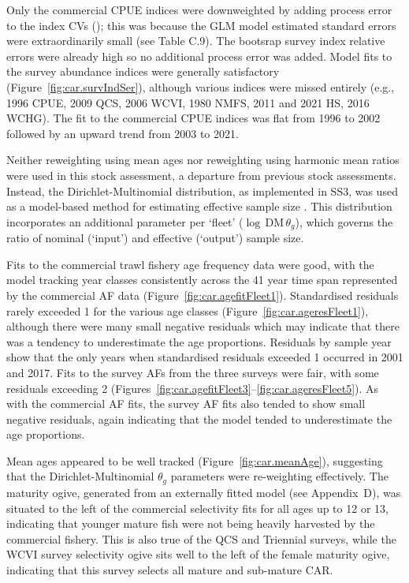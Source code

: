 \documentclass[11pt]{book}
\newcommand{\AppBio}{Appendix~D}
\begin{document}
Only the commercial CPUE indices were downweighted by adding process error to the index CVs (\cvpro); this was because the GLM model estimated standard errors were extraordinarily small (see Table C.9).
The bootsrap survey index relative errors were already high so no additional process error was added.
Model fits to the survey abundance indices were generally satisfactory (Figure~\ref{fig:car.survIndSer}), although various indices were missed entirely (e.g., 1996 CPUE, 2009 QCS, 2006 WCVI, 1980 NMFS, 2011 and 2021 HS, 2016 WCHG).
The fit to the commercial CPUE indices was flat from 1996 to 2002 followed by an upward trend from 2003 to 2021.

Neither \citet{Francis:2011} reweighting using mean ages nor \cite{McAllister-Ianelli:1997} reweighting using harmonic mean ratios were used in this stock assessment, a departure from previous stock assessments.
Instead, the Dirichlet-Multinomial distribution, as implemented in SS3, was used as a model-based method for estimating effective sample size \citep{Thorson-etal:2017}.
This distribution incorporates an additional parameter per `fleet' ($\log\,\text{DM}\,\theta_g$), which governs the ratio of nominal (`input') and effective (`output') sample size.

Fits to the commercial trawl fishery age frequency data were good, with the model tracking year classes consistently across the 41 year time span represented by the commercial AF data (Figure~\ref{fig:car.agefitFleet1}).
Standardised residuals rarely exceeded 1 for the various age classes (Figure~\ref{fig:car.ageresFleet1}), although there were many small negative residuals which may indicate that there was a tendency to underestimate the age proportions.
Residuals by sample year show that the only years when standardised residuals exceeded 1 occurred in 2001 and 2017.
Fits to the survey AFs from the three surveys were fair, with some residuals exceeding 2 (Figures~\ref{fig:car.agefitFleet3}--\ref{fig:car.ageresFleet5}).
As with the commercial AF fits, the survey AF fits also tended to show small negative residuals, again indicating that the model tended to underestimate the age proportions.

Mean ages appeared to be well tracked (Figure~\ref{fig:car.meanAge}), suggesting that the Dirichlet-Multinomial $\theta_g$ parameters were re-weighting effectively.
The maturity ogive, generated from an externally fitted model (see \AppBio), was situated to the left of the commercial selectivity fits for all ages up to 12 or 13, indicating that younger mature fish were not being heavily harvested by the commercial fishery.
This is also true of the QCS and Triennial surveys, while the WCVI survey selectivity ogive sits well to the left of the female maturity ogive, indicating that this survey selects all mature and sub-mature CAR.
\end{document}
